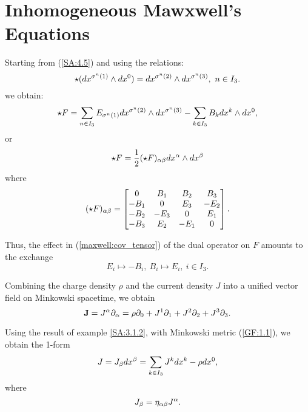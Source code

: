 \section{Inhomogeneous Mawxwell's Equations}

Starting from (\ref{SA:4.5}) and using the relations:
\begin{equation}
 \label{SA:3.19}
\star(dx^{\sigma^{n}(1)}\wedge dx^{0})=dx^{\sigma^{n}(2)}\wedge dx^{\sigma^{n}(3)}, \ n\in I_{3}.
\end{equation}
we obtain: 
\begin{equation}
 \label{SA:4.12}
\star F = \sum_{n \in I_{3}} E_{\sigma^{n}(1)}dx^{\sigma^{n}(2)}\wedge dx^{\sigma^{n}(3)} - \sum_{k \in I_{3}} B_{k} dx^{k} \wedge dx^{0},
\end{equation}
or 
\begin{equation}
 \label{SA:4.13}
\star F = \frac{1}{2} (\star F)_{\alpha \beta} dx^{\alpha} \wedge dx^{\beta}
\end{equation}
where
\begin{equation}
 \label{SA:4.14}
(\star F)_{\alpha \beta}=
\begin{bmatrix}
 0 & B_{1} & B_{2} & B_{3} \\
-B_{1} & 0 & E_{3} & -E_{2} \\
-B_{2} & -E_{3} & 0 & E_{1} \\
-B_{3} & E_{2} & -E_{1} & 0 
\end{bmatrix}.
\end{equation}

Thus, the effect in (\ref{maxwell:cov_tensor}) of the dual operator on $F$ amounts to the exchange 
$$
E_{i} \mapsto -B_{i}, \ B_{i} \mapsto E_{i}, \ i \in I_{3}.
$$

Combining the charge density $\rho$ and the current density $J$ into a unified vector field on Minkowski spacetime, we 
obtain
\begin{equation}
 \label{SA:4.15}
\textbf{J}=J^{\alpha}\partial_{\alpha}=\rho\partial_{0}+J^{1}\partial_{1}+J^{2}\partial_{2}+J^{3}\partial_{3}.
\end{equation}

Using the result of example \ref{SA:3.1.2}, with Minkowski metric (\ref{GF:1.1}), we obtain the 1-form
\begin{equation}
 \label{SA:4.16}
J=J_{\beta}dx^{\beta}=\sum_{k \in I_{3}}J^{k}dx^{k}-\rho dx^{0},
\end{equation}
where 
\begin{equation}
 \label{SA:4.17}
J_{\beta}=\eta_{\alpha \beta}J^{\alpha}.
\end{equation}

